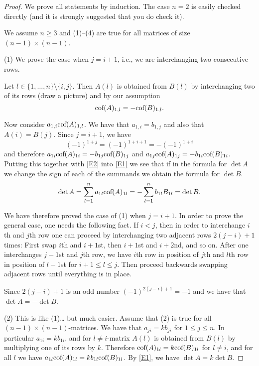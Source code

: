 \begin{proof} 
We prove all statements by induction. The case $n=2$ is easily checked directly (and it is strongly suggested that you do check it). 

We assume $n\geq 3$ and  (1)--(4) are true for all matrices of size $(n-1)\times (n-1)$. 

(1) 
We prove the case when $j=i+1$, i.e., we are interchanging two consecutive rows. 

Let $l\in \{1, \dots, n\}\setminus \{i,j\}$. 
Then $A(l)$ is obtained from $B(l)$ by interchanging two of its rows (draw a picture) and 
by our assumption 
\begin{equation} 
\label{E2} 
\mbox{\rm cof}(A)_{1,l}=-\mbox{\rm cof}(B)_{1,l}. 
\end{equation} 

Now consider $a_{1,i} \mbox{\rm cof}(A)_{1,l}$. We have that $a_{1,i}=b_{1,j}$ 
and also that $A(i)=B(j)$. Since $j=i+1$, we have 
\[
(-1)^{1+j}=(-1)^{1+i+1}=-(-1)^{1+i} 
\]
and therefore $a_{1i}\mbox{\rm cof}(A)_{1i}=-b_{1j} \mbox{\rm cof}(B)_{1j}$ and $a_{1j}\mbox{\rm cof}(A)_{1j}=-b_{1i} \mbox{\rm cof}(B)_{1i}$. 
Putting this together with \eqref{E2} into \eqref{E1} we see that if in the formula
for $\det A$ we change the sign of each of the summands we obtain the formula for $\det B$. 
\[
\det A=\sum_{l=1}^n a_{1l}\mbox{\rm cof}(A)_{1l}
=-\sum_{l=1}^n b_{1l} B_{1l}
=\det B. 
\]

We have therefore proved the case of (1) when $j=i+1$. In order to prove the general case, 
one needs the following fact. If $i<j$, then in order to interchange $i$th and $j$th row one 
can proceed by interchanging two adjacent rows $2(j-i)+1$ times: 
First swap $i$th and $i+1$st, then $i+1$st and $i+2$nd, and so on. 
After one interchanges $j-1$st and $j$th row, we have $i$th row in position of $j$th
and $l$th row in position of $l-1$st for $i+1\leq l\leq j$. Then proceed backwards 
swapping adjacent 
rows until everything is in place. 

Since $2(j-i)+1$ is an odd number $(-1)^{2(j-i)+1}=-1$ and 
we have that $\det A=-\det B$. 

(2) This is like (1)\dots{} but much easier. 
Assume that (2) is true for all $(n-1)\times (n-1)$-matrices. 
We have that $a_{ji}=k b_{ji}$ for $1\leq j\leq n$. 
In particular $a_{1i}=kb_{1i}$, and for $l\neq i$-matrix 
$A(l)$ is obtained from $B(l)$ by multiplying one of its rows by $k$. 
Therefore $\mbox{\rm cof}(A)_{1l}=k\mbox{\rm cof}(B)_{1l}$ for $l\neq i$, 
and for all $l$ we have $a_{1l} \mbox{\rm cof}(A)_{1l}=k b_{1l}\mbox{\rm cof}(B)_{1l}$. 
By \eqref{E1}, we have $\det A=k\det B$. 


\end{proof}
